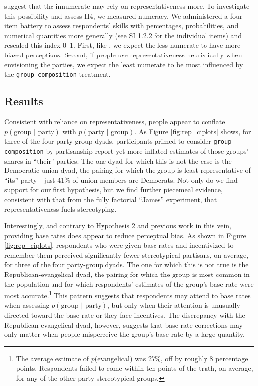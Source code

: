 \documentclass[12pt, letterpaper]{article}
\begin{document}
\citet{sides2007b} suggest that the innumerate may rely on representativeness more. To investigate this possibility and assess H4, we measured numeracy. We administered a four-item battery to assess respondents' skills with percentages, probabilities, and numerical quantities more generally (see SI 1.2.2 for the individual items) and rescaled this index 0--1. First, like \citet{sides2007b}, we expect the less numerate to have more biased perceptions. Second, if people use representativeness heuristically when envisioning the parties, we expect the least numerate to be most influenced by the {\tt group composition} treatment.

\subsection{Results}

Consistent with reliance on representativeness, people appear to conflate $p(\text{group | party})$ with $p(\text{party | group})$. As Figure \ref{fig:rep_ciplots} shows, for three of the four party-group dyads, participants primed to consider {\tt group composition} by partisanship report yet-more inflated estimates of those groups' shares in ``their'' parties. The one dyad for which this is not the case is the Democratic-union dyad, the pairing for which the group is least representative of ``its'' party---just 41\% of union members are Democrats. Not only do we find support for our first hypothesis, but we find further piecemeal evidence, consistent with that from the fully factorial ``James'' experiment, that representativeness fuels stereotyping. 

Interestingly, and contrary to Hypothesis 2 and previous work in this vein, providing base rates does appear to reduce perceptual bias. As shown in Figure \ref{fig:rep_ciplots}, respondents who were given base rates and incentivized to remember them perceived significantly fewer stereotypical partisans, on average, for three of the four party-group dyads. The one for which this is not true is the Republican-evangelical dyad, the pairing for which the group is most common in the population and for which respondents' estimates of the group's base rate were most accurate.\footnote{The average estimate of $p$(evangelical) was 27\%, off by roughly 8 percentage points. Respondents failed to come within ten points of the truth, on average, for any of the other party-stereotypical groups.} This pattern suggests that respondents may attend to base rates when assessing $p(\text{group | party})$, but only when their attention is unusually directed toward the base rate or they face incentives. The discrepancy with the Republican-evangelical dyad, however, suggests that base rate corrections may only matter when people misperceive the group's base rate by a large quantity.
\end{document}
